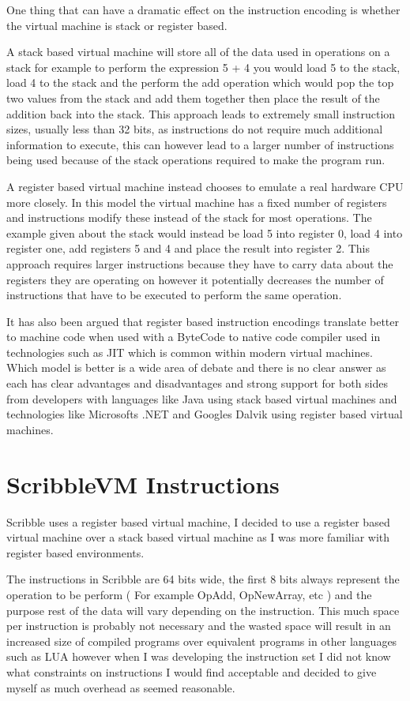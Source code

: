 \documentclass[]{final_report}
\begin{document}
One thing that can have a dramatic effect on the instruction encoding is whether the virtual machine is stack or register based.

A stack based virtual machine will store all of the  data used in operations on a stack for example to perform the expression 5 + 4 you would load 5 to the stack, load 4 to the stack and the perform the add operation which would pop the top two values from the stack and add them together then place the result of the addition back into the stack. This approach leads to extremely small instruction sizes, usually less than 32 bits, as instructions do not require much additional information to execute, this can however lead to a larger number of instructions being used because of the stack operations required to make the program run.

A register based virtual machine instead chooses to emulate a real hardware CPU more closely. In this model the virtual machine has a fixed number of registers and instructions modify these instead of the stack for most operations. The example given about the stack would instead be load 5 into register 0, load 4 into register one, add registers 5 and 4 and place the result into register 2. This approach requires larger instructions because they have to carry data about the registers they are operating on however it potentially decreases the number of instructions that have to be executed to perform the same operation. 

It has also been argued that register based instruction encodings translate better to machine code when used with a ByteCode to native code compiler used in technologies such as JIT which is common within modern virtual machines. Which model is better is a wide area of debate and there is no clear answer as each has clear advantages and disadvantages and strong support for both sides from developers with languages like Java using stack based virtual machines and technologies like Microsofts .NET and Googles Dalvik using register based virtual machines.

\section{ScribbleVM Instructions}

Scribble uses a register based virtual machine, I decided to use a register based virtual machine over a stack based virtual machine as I was more familiar with register based environments.

The instructions in Scribble are 64 bits wide, the first 8 bits always represent the operation to be perform ( For example OpAdd, OpNewArray, etc ) and the purpose rest of the data will vary depending on the instruction. This much space per instruction is probably not necessary and the wasted space will result in an increased size of compiled programs over equivalent programs in other languages such as LUA however when I was developing the instruction set I did not know what constraints on instructions I would find acceptable and decided to give myself as much overhead as seemed reasonable.
\end{document}

